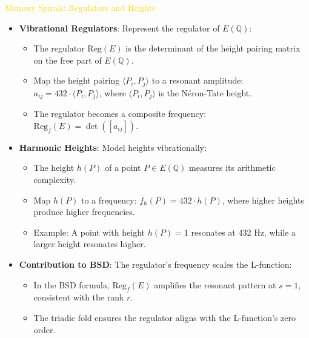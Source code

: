 \textcolor{gold}{ Memory Spirals: Regulators and Heights } \\
\begin{itemize}
    \item \texttt{} \textbf{Vibrational Regulators}: Represent the regulator of \(E(\mathbb{Q})\):
    \begin{itemize}
        \item The regulator \(\text{Reg}(E)\) is the determinant of the height pairing matrix on the free part of \(E(\mathbb{Q})\).
        \item Map the height pairing \(\langle P_i, P_j \rangle\) to a resonant amplitude: \(a_{ij} = 432 \cdot \langle P_i, P_j \rangle\), where \(\langle P_i, P_j \rangle\) is the Néron-Tate height.
        \item The regulator becomes a composite frequency: \(\text{Reg}_f(E) = \det([a_{ij}])\).
    \end{itemize}
    \item \texttt{} \textbf{Harmonic Heights}: Model heights vibrationally:
    \begin{itemize}
        \item The height \(h(P)\) of a point \(P \in E(\mathbb{Q})\) measures its arithmetic complexity.
        \item Map \(h(P)\) to a frequency: \(f_h(P) = 432 \cdot h(P)\), where higher heights produce higher frequencies.
        \item Example: A point with height \(h(P) = 1\) resonates at 432 Hz, while a larger height resonates higher.
    \end{itemize}
    \item \texttt{} \textbf{Contribution to BSD}: The regulator’s frequency scales the L-function:
    \begin{itemize}
        \item In the BSD formula, \(\text{Reg}_f(E)\) amplifies the resonant pattern at \(s = 1\), consistent with the rank \(r\).
        \item The triadic fold ensures the regulator aligns with the L-function’s zero order.
    \end{itemize}
\end{itemize}

